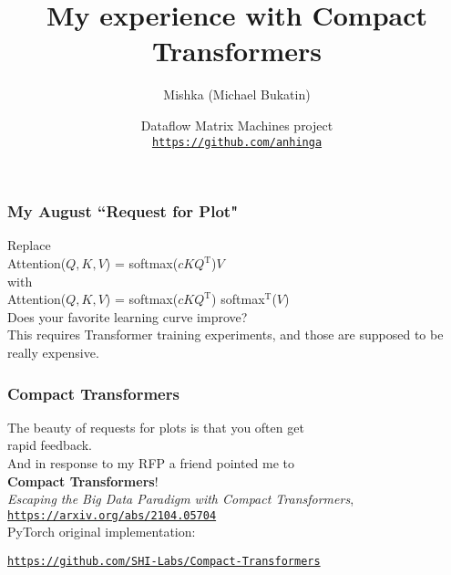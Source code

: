 \documentclass{beamer}
\newcommand{\msmagenta}[1]{{\color{mymagenta} #1}}
\begin{document}
\title{My experience with Compact Transformers}
\author{Mishka (Michael Bukatin)}

\date
{\footnotesize 
Dataflow Matrix Machines project\\[2ex]

\href{https://github.com/anhinga}{\tt https://github.com/anhinga}\\[2ex]

}

\begin{frame}
  \titlepage
\end{frame}

\begin{frame}

\frametitle{My August ``Request for Plot"}

Replace\\[2ex]

\hspace{0.5in}Attention($Q, K, V$) = softmax($cKQ^\text{T}$)$V$\\[2ex]

with\\[2ex]

\hspace{0.5in}Attention($Q, K, V$) = softmax($cKQ^\text{T}$)\msmagenta{softmax$^\text{T}$}($V$)\\[4ex]

Does your favorite learning curve improve?\\[8ex]

This requires Transformer training experiments, and those are supposed to be really expensive.


\end{frame}


\begin{frame}

\frametitle{Compact Transformers}

The beauty of requests for plots is that you often get\\ rapid feedback.\\[2ex]

And in response to my RFP a friend pointed me to\\ {\bf Compact Transformers}!\\[2ex]

{\em Escaping the Big Data Paradigm with Compact Transformers},
\href{https://arxiv.org/abs/2104.05704}{\tt https://arxiv.org/abs/2104.05704}\\[2ex]

PyTorch original implementation:

\href{https://github.com/SHI-Labs/Compact-Transformers}{\tt https://github.com/SHI-Labs/Compact-Transformers}


\end{frame}
\end{document}
